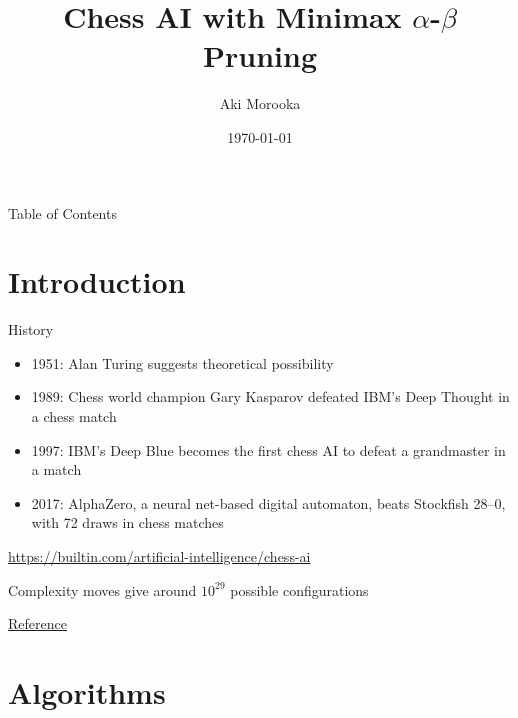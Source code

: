 \documentclass{beamer}
\title[Chess AI]{Chess AI with Minimax $\alpha$-$\beta$ Pruning}
\author{Aki Morooka}
\institute[Metropolia UAS]{Metropolia University of Applied Sciences}
\date{\today}
\begin{document}
\begin{frame}
  \titlepage
\end{frame}

\begin{frame}{Table of Contents}
  \tableofcontents
\end{frame}


\section{Introduction}


\begin{frame}{History}
  \begin{itemize}
    \item 1951: Alan Turing suggests theoretical possibility
    \item 1989: Chess world champion Gary Kasparov defeated IBM’s Deep Thought in a chess match
    \item 1997: IBM’s Deep Blue becomes the first chess AI to defeat a grandmaster in a match

    \item 2017: AlphaZero, a neural net-based digital automaton, beats Stockfish 28–0, with 72 draws in chess matches
  \end{itemize}

\vspace{1cm}
\href{https://builtin.com/artificial-intelligence/chess-ai}{https://builtin.com/artificial-intelligence/chess-ai}
\end{frame}

\begin{frame}{Complexity}
 moves give around  $10^{29}$ possible configurations

    \vspace{1cm}

\href{https://www.reddit.com/r/chess/comments/o1bwhw/a_model_for_the_number_of_possible_moves_in_chess/}{Reference}
\end{frame}

\section{Algorithms}
\end{document}

